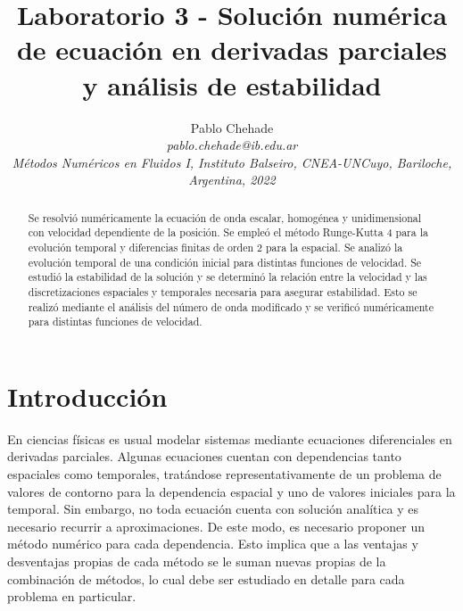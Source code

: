 \documentclass[aps,prb,twocolumn,superscriptaddress,floatfix,longbibliography,10pt]{revtex4-2}
\newcounter{para}
\begin{document}
\newcommand{\mytitle}{Laboratorio 3 - Solución numérica de ecuación en derivadas parciales y análisis de estabilidad}

\title{\mytitle}

\author{Pablo Chehade \\
    \small \textit{pablo.chehade@ib.edu.ar} \\
    \small \textit{Métodos Numéricos en Fluidos I, Instituto Balseiro, CNEA-UNCuyo, Bariloche, Argentina, 2022} \\}


\begin{abstract}

Se resolvió numéricamente la ecuación de onda escalar, homogénea y unidimensional con velocidad dependiente de la posición. Se empleó el método Runge-Kutta 4 para la evolución temporal y diferencias finitas de orden 2 para la espacial. Se analizó la evolución temporal de una condición inicial para distintas funciones de velocidad. Se estudió la estabilidad de la solución y se determinó la relación entre la velocidad y las discretizaciones espaciales y temporales necesaria para asegurar estabilidad. Esto se realizó mediante el análisis del número de onda modificado y se verificó numéricamente para distintas funciones de velocidad.

\end{abstract}

\maketitle

\section{Introducción}

En ciencias físicas es usual modelar sistemas mediante ecuaciones diferenciales en derivadas parciales. Algunas ecuaciones cuentan con dependencias tanto espaciales como temporales, tratándose representativamente de un problema de valores de contorno para la dependencia espacial y uno de valores iniciales para la temporal. Sin embargo, no toda ecuación cuenta con solución analítica y es necesario recurrir a aproximaciones. De este modo, es necesario proponer un método numérico para cada dependencia. Esto implica que a las ventajas y desventajas propias de cada método se le suman nuevas propias de la combinación de métodos, lo cual debe ser estudiado en detalle para cada problema en particular.
\end{document}
